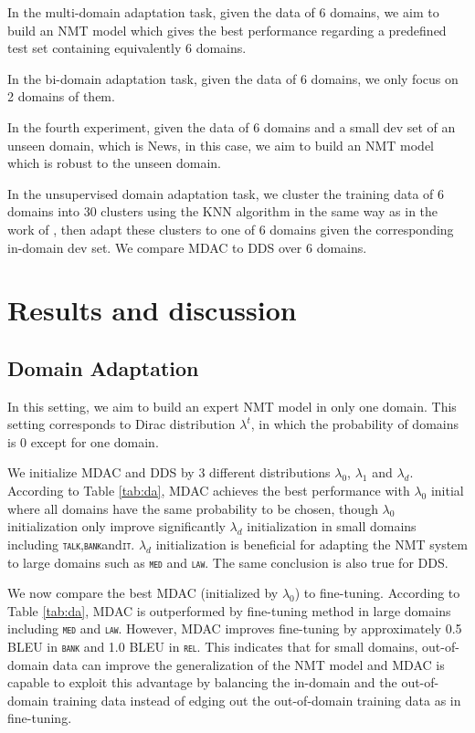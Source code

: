 \documentclass[11pt]{article}
\newcommand{\domain}[1]{\texttt{\textsc{#1}}}
\begin{document}
In the multi-domain adaptation task, given the data of 6 domains, we aim to build an NMT model which gives the best performance regarding a predefined test set containing equivalently 6 domains.

In the bi-domain adaptation task, given the data of 6 domains, we only focus on 2 domains of them.

In the fourth experiment, given the data of 6 domains and a small dev set of an unseen domain, which is News, in this case, we aim to build an NMT model which is robust to the unseen domain.

In the unsupervised domain adaptation task, we cluster the training data of 6 domains into 30 clusters using the KNN algorithm in the same way as in the work of \citet{Tars18multidomain}, then adapt these clusters to one of 6 domains given the corresponding in-domain dev set. We compare MDAC to DDS over 6 domains.

\section{Results and discussion \label{sec:results}}

\subsection{Domain Adaptation}\label{ssec:da}
In this setting, we aim to build an expert NMT model in only one domain. This setting corresponds to Dirac distribution $\lambda^t$, in which the probability of domains is 0 except for one domain.

We initialize MDAC and DDS by 3 different distributions $\lambda_0$, $\lambda_1$ and $\lambda_d$. According to Table \ref{tab:da}, MDAC achieves the best performance with $\lambda_0$ initial where all domains have the same probability to be chosen, though $\lambda_0$  initialization only improve significantly $\lambda_d$ initialization in small domains including \domain{talk},\domain{bank}and\domain{it}. $\lambda_d$ initialization is beneficial for adapting the NMT system to large domains such as \domain{med} and \domain{law}. The same conclusion is also true for DDS. 

We now compare the best MDAC (initialized by $\lambda_0$) to fine-tuning. According to Table \ref{tab:da}, MDAC is outperformed by fine-tuning method in large domains including \domain{med} and \domain{law}. However, MDAC improves fine-tuning by approximately 0.5 BLEU in \domain{bank} and 1.0 BLEU in \domain{rel}. This indicates that for small domains, out-of-domain data can improve the generalization of the NMT model and MDAC is capable to exploit this advantage by balancing the in-domain and the out-of-domain training data instead of edging out the out-of-domain training data as in fine-tuning.
\end{document}
